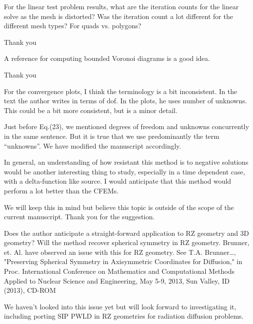 \documentclass{article}
\begin{document}
{
\color{blue}
For the linear test problem results, what are the iteration counts for the linear solve as the mesh is
distorted? Was the iteration count a lot different for the different mesh types? For quads vs. polygons?
}


Thank you
\bigskip


{
\color{blue}
A reference for computing bounded Voronoi diagrams is a good idea.
}


Thank you
\bigskip


{
\color{blue}
For the convergence plots, I think the terminology is a bit inconsistent. In the text the author writes
in terms of dof. In the plots, he uses number of unknowns. This could be a bit more consistent, but is a
minor detail.
}

Just before Eq.(23), we mentioned degrees of freedom and unknowns concurrently in the same sentence. But it is true
that we use predominantly the term ``unknowns''. We have modified the manuscript accordingly.

\bigskip


{
\color{blue}
In general, an understanding of how resistant this method is to negative solutions would be another
interesting thing to study, especially in a time dependent case, with a delta-function like source. I would
anticipate that this method would perform a lot better than the CFEMs.
}

We will keep this in mind but believe this topic is outside of the scope of the current manuscript. Thank you
for the suggestion.
\bigskip



{
\color{blue}
Does the author anticipate a straight-forward application to RZ geometry and 3D geometry? Will the
method recover spherical symmetry in RZ geometry. Brunner, et. Al. have observed an issue with this for RZ
geometry. See T.A. Brunner…, "Preserving Spherical Symmetry in Axisymmetric Coordinates for Diffusion,"
in Proc. International Conference on Mathematics and Computational Methods Applied to Nuclear Science and
Engineering, May 5-9, 2013, Sun Valley, ID (2013), CD-ROM
}

We haven't looked into this issue yet but will look forward to investigating it, including porting SIP PWLD in RZ geometries
for radiation diffusion problems.
\bigskip
\end{document}
